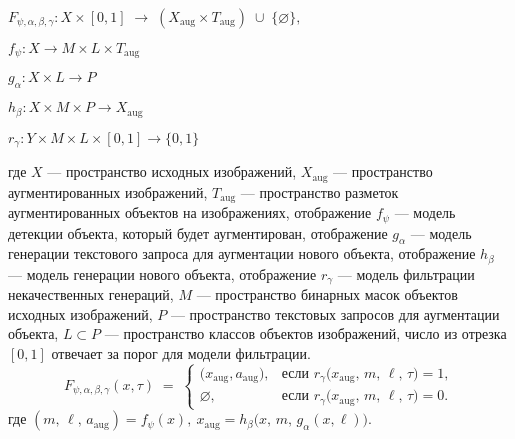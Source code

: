 \begin{center}

$
F_{\psi,\alpha,\beta,\gamma} : X \times [0,1] \;\longrightarrow\; (X_{\text{aug}} \times T_{\text{aug}}) \;\cup\; \{\varnothing\}, 
$

\end{center}
\begin{center}
$ f_{\psi}: X \to M \times L \times T_{\text{aug}}$
\end{center}
\begin{center}
$ g_{\alpha}: X \times L \to P$
\end{center}
\begin{center}
$ h_{\beta}: X \times M \times P \to X_{\text{aug}}$

\end{center}
\begin{center}
$ r_{\gamma}: Y \times M \times L \times [0,1] \to \{0,1\}$

\end{center}


где $X$ — пространство исходных изображений,  
$X_{\text{aug}}$ — пространство аугментированных изображений, $T_{\text{aug}}$ — пространство разметок аугментированных объектов на изображениях, отображение
$f_{\psi}$ — модель детекции объекта, который будет аугментирован, отображение $g_{\alpha}$ — модель генерации текстового запроса для аугментации нового объекта, отображение $h_{\beta}$ — модель генерации нового объекта, отображение $r_{\gamma}$ — модель фильтрации некачественных генераций, $M$ — пространство бинарных масок объектов исходных изображений, $P$ — пространство текстовых запросов для аугментации объекта, 
$L \subset P$ — пространство классов объектов изображений,
число из отрезка $[0,1]$ отвечает за порог для модели фильтрации.
\[
F_{\psi,\alpha,\beta,\gamma}(x, \tau) \;=\;
\begin{cases}
\bigl(x_\mathrm{aug}, a_\mathrm{aug}), 
& \text{если } r_{\gamma}\bigl(x_\mathrm{aug},\,m,\,\ell,\,\tau\bigr) = 1,\\[1em]
\varnothing, 
& \text{если } r_{\gamma}\bigl(x_\mathrm{aug},\,m,\,\ell,\,\tau\bigr) = 0.
\end{cases}
\]
где 
$ 
(m,\,\ell,\, a_\mathrm{aug}) = f_{\psi}(x),  \ x_\mathrm{aug} = h_{\beta}\bigl(x,\,m,\,g_{\alpha}(x, \ell)\bigr)$.


